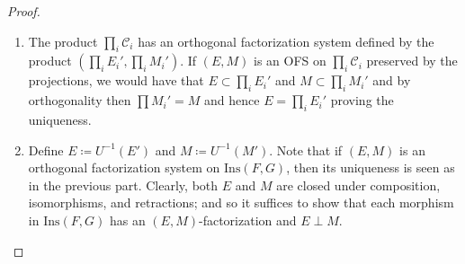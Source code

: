 \documentclass[11pt]{article}
\theoremstyle{plain}
\theoremstyle{definition}
\numberwithin{equation}{section}
\newcommand{\C}{\mathcal{C}}
\newcommand{\Ins}{\mathrm{Ins}}
\begin{document}
\begin{proof}
\hfill
\begin{enumerate}
   \item The product $\prod_i \C_i$ has an orthogonal factorization system defined by the product $(\prod_iE_i',\prod_i M_i')$. If $(E,M)$ is an OFS on $\prod_i \C_i$ preserved by the projections, we would have that $E\subset \prod_i E_i'$ and $M\subset \prod_i M_i'$ and by orthogonality then $\prod M_i'= M$ and hence $E = \prod_i E_i'$ proving the uniqueness.

   \item Define $E \coloneqq U^{-1}(E')$ and $M \coloneqq U^{-1}(M')$. Note that if $(E,M)$ is an orthogonal factorization system on $\Ins(F,G)$, then its uniqueness is seen as in the previous part. Clearly, both $E$ and $M$ are closed under composition, isomorphisms, and retractions; and so it suffices to show that each morphism in $\Ins(F,G)$ has an $(E,M)$-factorization and $E\perp M$.
   

\end{enumerate}
\end{proof}
\end{document}
